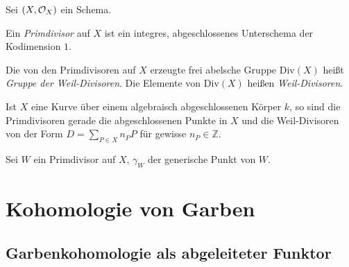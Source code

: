 \documentclass[11pt]{book}
\theoremstyle{nonumberbreak}
\newenvironment{definbem}[1][]{\ifthenelse{\equal{#1}{}}{\definibem}{\definibem[#1]}\rm}{\enddefinibem}
\begin{document}
\begin{spacing}{1.4}
\begin{definbem}
Sei $(X, \mathcal{O}_X)$ ein Schema.
\begin{compactenum}
\item Ein \textit{Primdivisor} auf $X$ ist ein integres, abgeschlossenes Unterschema der Kodimension $1$.
\item Die von den Primdivisoren auf $X$ erzeugte frei abelsche Gruppe $\mathrm{Div}(X)$ heißt \textit{Gruppe der Weil-Divisoren}. Die Elemente von $\mathrm{Div}(X)$ heißen \textit{Weil-Divisoren}.
\item Ist $X$ eine Kurve über einem algebraisch abgeschlossenen Körper $k$, so sind die Primdivisoren gerade die abgeschlossenen Punkte in $X$ und die Weil-Divisoren von der Form $D=\sum_{P \in X} n_P P$ für gewisse $n_P \in \mathbb{Z}$.
\item Sei $W$ ein Primdivisor auf $X$, $\gamma_W$ der generische Punkt von $W$.
\end{compactenum}
\end{definbem}


































\chapter{Kohomologie von Garben} %
\setlength\abovedisplayshortskip{0pt}
\setlength\belowdisplayshortskip{10pt}
\setlength\abovedisplayskip{10pt}
\setlength\belowdisplayskip{10pt}

\newcommand{\C}{\mathcal{C}}
\newcommand{\coker}{\mathrm{coker}}

\setcounter{section}{11}
\renewcommand*\thesection{§ \arabic{section}\quad}
\section{Garbenkohomologie als abgeleiteter Funktor} %
\renewcommand*\thesection{\arabic{section}}
\thispagestyle{empty}



\end{spacing}
\end{document}

